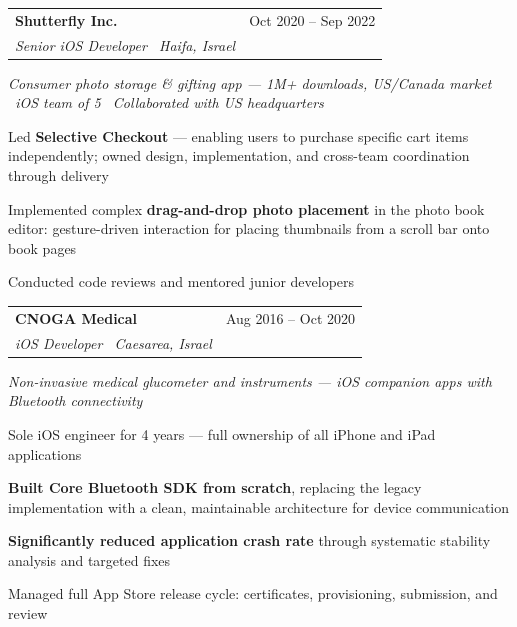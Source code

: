 \documentclass[10pt,a4paper]{article}
\makeatletter
\newlength{\cvsecbefore}\setlength{\cvsecbefore}{2pt}
\newlength{\cvsecafter}\setlength{\cvsecafter}{1pt}
\newcommand{\cvsection}[1]{%
  \vspace{\cvsecbefore}%
  {\bfseries\large\color{navy}#1}\par
  \vspace{1pt}{\color{navy}\hrule height 0.9pt}%
  \vspace{\cvsecafter}%
}
\renewcommand{\section}{\@ifstar{\cv@section}{\cv@section@opt}}
\newcommand{\cv@section}[1]{\cvsection{#1}}
\newcommand{\cv@section@opt}[2][]{\cvsection{#2}}
\newcommand{\jobheader}[4]{%
  \vspace{1pt}%
  \noindent
  \begin{tabularx}{\textwidth}{@{}Xr@{}}
    {\bfseries\color{black} #1} & {\small\color{midgray} #4} \\[-2pt]
    {\small\itshape\color{midgray} #2 \textbullet\ #3} & \\
  \end{tabularx}%
  \vspace{0pt}%
}
\newlength{\cvitemsep}\setlength{\cvitemsep}{0.5pt}
\newlength{\cvtopsep}\setlength{\cvtopsep}{1pt}
\newlength{\cvparsep}\setlength{\cvparsep}{0pt}
\renewenvironment{itemize}{%
  \begin{list}{\small\textbullet}{%
      \setlength{\leftmargin}{1.4em}%
      \setlength{\labelwidth}{1em}%
      \setlength{\labelsep}{0.4em}%
      \setlength{\itemsep}{\cvitemsep}%
      \setlength{\topsep}{\cvtopsep}%
      \setlength{\parsep}{\cvparsep}%
      \setlength{\partopsep}{0pt}%
    }%
}{%
  \end{list}%
}
\makeatother
\begin{document}
\jobheader{Shutterfly Inc.}{Senior iOS Developer}{Haifa, Israel}{Oct 2020 – Sep 2022}
{\small\color{midgray}\itshape
  Consumer photo storage \& gifting app — 1M+ downloads, US/Canada market \textbullet\ iOS team of 5 \textbullet\ Collaborated with US headquarters
}
\begin{itemize}
  \item Led \textbf{Selective Checkout} — enabling users to purchase specific cart items
        independently; owned design, implementation, and cross-team coordination through delivery
  \item Implemented complex \textbf{drag-and-drop photo placement} in the photo book editor:
        gesture-driven interaction for placing thumbnails from a scroll bar onto book pages
  \item Conducted code reviews and mentored junior developers
\end{itemize}

\jobheader{CNOGA Medical}{iOS Developer}{Caesarea, Israel}{Aug 2016 – Oct 2020}
{\small\color{midgray}\itshape
  Non-invasive medical glucometer and instruments — iOS companion apps with Bluetooth connectivity
}
\begin{itemize}
  \item Sole iOS engineer for 4 years — full ownership of all iPhone and iPad applications
  \item \textbf{Built Core Bluetooth SDK from scratch}, replacing the legacy implementation with a
        clean, maintainable architecture for device communication
  \item \textbf{Significantly reduced application crash rate} through systematic stability analysis
        and targeted fixes
  \item Managed full App Store release cycle: certificates, provisioning, submission, and review
\end{itemize}

\section{Technical Skills}
\end{document}
